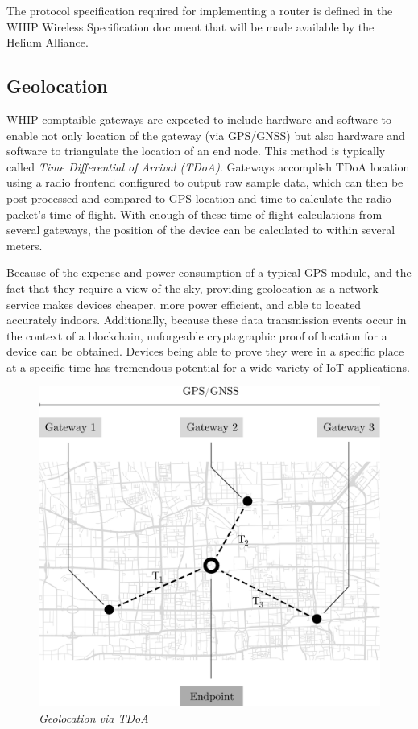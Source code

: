 \documentclass[letterpaper,11pt]{article}
\begin{document}
The protocol specification required for implementing a router is defined in the WHIP Wireless Specification document that will be made available by the Helium Alliance\cite{alliance}.

\subsection{Geolocation} \label{geolocation}

WHIP-comptaible gateways are expected to include hardware and software to enable not only location of the gateway (via GPS/GNSS) but also hardware and software to triangulate the location of an end node. This method is typically called \emph{Time Differential of Arrival (TDoA)}. Gateways accomplish TDoA location using a radio frontend configured to output raw sample data, which can then be post processed and compared to GPS location and time to calculate the radio packet's time of flight. With enough of these time-of-flight calculations from several gateways, the position of the device can be calculated to within several meters.\newline

Because of the expense and power consumption of a typical GPS module, and the fact that they require a view of the sky, providing geolocation as a network service makes devices cheaper, more power efficient, and able to located accurately indoors. Additionally, because these data transmission events occur in the context of a blockchain, unforgeable cryptographic proof of location for a device can be obtained. Devices being able to prove they were in a specific place at a specific time has tremendous potential for a wide variety of IoT applications.\newline

\begin{figure}[H]
	\begin{center}
  		\includegraphics[scale=0.3]{tdoa.eps}
  		\caption{\emph{Geolocation via TDoA}}
  		\label{fig:tdoa}
 	\end{center}
\end{figure}
\end{document}
